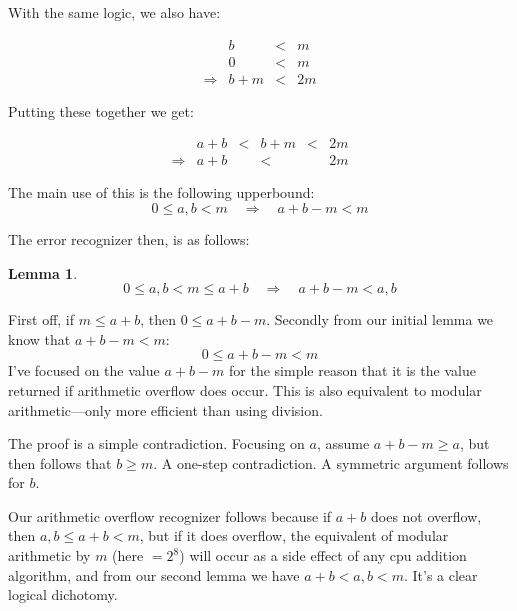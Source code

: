 \documentclass[twoside]{article}
\newtheorem{lemma}{Lemma}[section]
\begin{document}
With the same logic, we also have:

$$ \begin{array}{lrcl}
 & b & < & m \\
 & 0 & < & m \\
\Longrightarrow & b+m & < & 2m
\end{array} $$

Putting these together we get:

$$ \begin{array}{lrcccl}
 & a+b & < & b+m & < & 2m \\
\Longrightarrow & a+b && < && 2m
\end{array} $$

The main use of this is the following upperbound:
$$ 0\leq a,b<m\quad\Longrightarrow\quad a+b-m < m $$

The error recognizer then, is as follows:

\begin{lemma} $$ 0\leq a,b < m\leq a+b\quad\Longrightarrow\quad a+b-m < a,b $$
\end{lemma}

First off, if $ m\leq a+b $, then $ 0\leq a+b-m $. Secondly from our initial lemma we know that $ a+b-m < m $:
$$ 0\leq a+b-m < m $$
I've focused on the value $ a+b-m $ for the simple reason that it is the value returned if arithmetic overflow
does occur. This is also equivalent to modular arithmetic---only more efficient than using division.

The proof is a simple contradiction. Focusing on $ a $, assume $ a+b-m\geq a $, but then follows that $ b\geq m $.
A one-step contradiction.  A symmetric argument follows for $ b $.

Our arithmetic overflow recognizer follows because if $ a+b $ does not overflow, then $ a,b\leq a+b < m $,
but if it does overflow, the equivalent of modular arithmetic by $ m $ (here $ =2^8 $) will occur as a side effect
of any cpu addition algorithm, and from our second lemma we have $ a+b < a,b < m $. It's a clear logical dichotomy.
\end{document}
